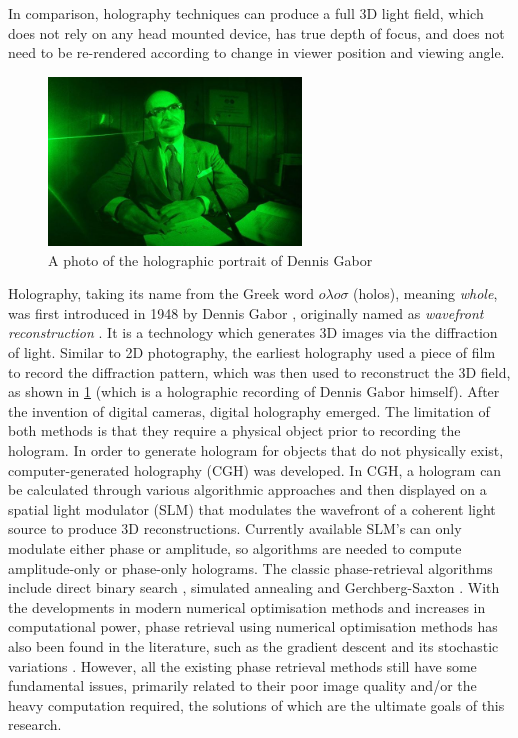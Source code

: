 In comparison, holography techniques can produce a full 3D light field, which does not rely on any head mounted device, has true depth of focus, and does not need to be re-rendered according to change in viewer position and viewing angle.

\begin{figure}[H]
    \centering
    \includegraphics[width=0.6\textwidth]{Dennis-Gabor-Hologram-2.jpg}
    \caption{A photo of the holographic portrait of Dennis Gabor \cite{Lo2018}}\label{fig:Dennis-Gabor-Hologram-2}
\end{figure}

Holography, taking its name from the Greek word $o \lambda o \sigma $ (holos), meaning \textit{whole}, was first introduced in 1948 by Dennis Gabor \cite{Gabor1948}, originally named as \textit{wavefront reconstruction} \cite{Hecht2017}. It is a technology which generates 3D images via the diffraction of light. Similar to 2D photography, the earliest holography used a piece of film to record the diffraction pattern, which was then used to reconstruct the 3D field, as shown in \cref{fig:Dennis-Gabor-Hologram-2} (which is a holographic recording of Dennis Gabor himself). After the invention of digital cameras, digital holography emerged. The limitation of both methods is that they require a physical object prior to recording the hologram. In order to generate hologram for objects that do not physically exist, computer-generated holography (CGH) was developed. In CGH, a hologram can be calculated through various algorithmic approaches and then displayed on a spatial light modulator (SLM) that modulates the wavefront of a coherent light source to produce 3D reconstructions. Currently available SLM's can only modulate either phase or amplitude, so algorithms are needed to compute amplitude-only or phase-only holograms. The classic phase-retrieval algorithms include direct binary search \cite{Seldowitz1987}, simulated annealing \cite{Kirkpatrick1983} and Gerchberg-Saxton \cite{Gerchberg1972}. With the developments in modern numerical optimisation methods and increases in computational power, phase retrieval using numerical optimisation methods has also been found in the literature, such as the gradient descent \cite{Zhang2017, Liu2020} and its stochastic variations \cite{Chen2021, Choi2021, Kadis2022}. However, all the existing phase retrieval methods still have some fundamental issues, primarily related to their poor image quality and/or the heavy computation required, the solutions of which are the ultimate goals of this research.

